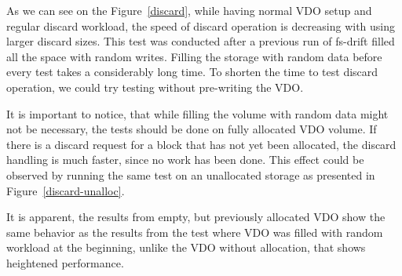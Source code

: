 \documentclass[
  color, %
  table, %
  lof,   %
  lot,   %
]{fithesis3}
\begin{document}
As we can see on the Figure~\ref{discard}, while having normal VDO setup and regular discard workload, the speed of discard operation is decreasing with using larger discard sizes. This test was conducted after a previous run of fs-drift filled all the space with random writes. Filling the storage with random data before every test takes a considerably long time. To shorten the time to test discard operation, we could try testing without pre-writing the VDO.

It is important to notice, that while filling the volume with random data might not be necessary, the tests should be done on fully allocated VDO volume. If there is a discard request for a block that has not yet been allocated, the discard handling is much faster, since no work has been done. This effect could be observed by running the same test on an unallocated storage as presented in Figure~\ref{discard-unalloc}.

It is apparent, the results from empty, but previously allocated VDO show the same behavior as the results from the test where VDO was filled with random workload at the beginning, unlike the VDO without allocation, that shows heightened performance.
\end{document}
